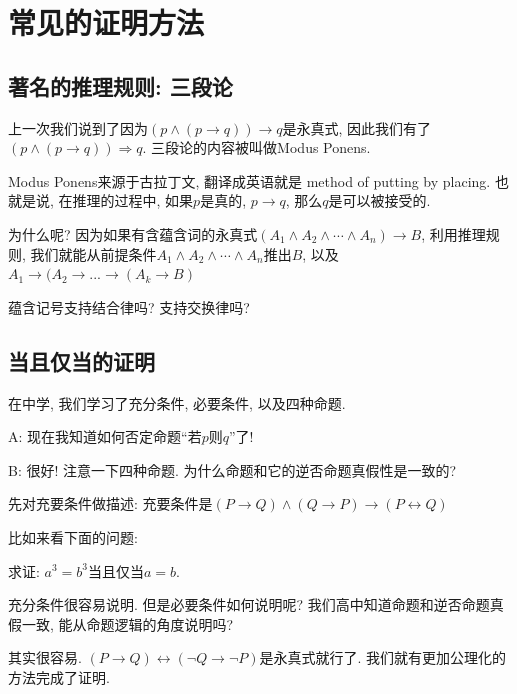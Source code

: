 \section{常见的证明方法}

\subsection*{著名的推理规则: 三段论}

上一次我们说到了因为$(p\land (p\to q))\to q$是永真式, 因此我们有了$(p\land (p\to q))\Rightarrow q$. 三段论的内容被叫做Modus Ponens. 

Modus Ponens来源于古拉丁文, 翻译成英语就是 method of putting by placing. 也就是说, 在推理的过程中, 如果$p$是真的, $p\rightarrow q$, 那么$q$是可以被接受的. 

为什么呢? 因为如果有含蕴含词的永真式$(A_1\land A_2\land\cdots\land A_n)\to B$, 利用推理规则, 我们就能从前提条件$A_1\land A_2\land\cdots\land A_n$推出$B$, 以及$A_1 \rightarrow (A_2 \rightarrow ... \rightarrow (A_k\rightarrow B)$

\begin{bonus}
	蕴含记号支持结合律吗? 支持交换律吗? 
\end{bonus}

\subsection*{当且仅当的证明}

在中学, 我们学习了充分条件, 必要条件, 以及四种命题. 

\begin{dialogue}
	A: 现在我知道如何否定命题``若$p$则$q$''了!
	
	B: 很好! 注意一下四种命题. 为什么命题和它的逆否命题真假性是一致的?  
\end{dialogue}

先对充要条件做描述: 充要条件是$(P\rightarrow Q)\land (Q\rightarrow P)\rightarrow (P\leftrightarrow Q)$

比如来看下面的问题: 

\begin{prob}
	求证: $a^3=b^3$当且仅当$a=b$.
\end{prob}

充分条件很容易说明. 但是必要条件如何说明呢? 我们高中知道命题和逆否命题真假一致, 能从命题逻辑的角度说明吗? 

其实很容易. $(P\rightarrow Q )\leftrightarrow (\lnot Q\rightarrow\lnot P)$是永真式就行了. 我们就有更加公理化的方法完成了证明. 

